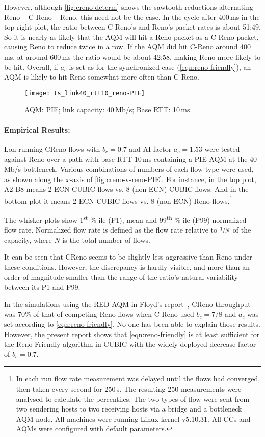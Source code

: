 However, although \autoref{fig:creno-determ} shows the sawtooth reductions alternating Reno -- C-Reno -- Reno, this need not be the case. In the cycle after 400\,ms in the top-right plot, the ratio between C-Reno's and Reno's packet rates is about 51:49. So it is nearly as likely that the AQM will hit a Reno packet as a C-Reno packet, causing Reno to reduce twice in a row. If the AQM did hit C-Reno around 400\,ms, at around 600\,ms the ratio would be about 42:58, making Reno more likely to be hit. Overall, if \(a_c\) is set as for the synchronized case (\autoref{eqn:reno-friendly}), an AQM is likely to hit Reno somewhat more often than C-Reno.

\begin{figure}
	\centering
	\texttt{[image: ts\_link40\_rtt10\_reno-PIE]}
	\caption{AQM: PIE; link capacity: 40\,Mb/s; Base RTT: 10\,ms.}\label{fig:creno-v-reno-PIE}
\end{figure}
\paragraph{Empirical Results:} Lon-running CReno flows with \(b_c = 0.7\) and AI factor \(a_c=1.53\) were tested against Reno over a path with base RTT 10\,ms containing a PIE AQM at the 40\,Mb/s bottleneck. Various combinations of numbers of each flow type were used, as shown along the \(x\)-axis of \autoref{fig:creno-v-reno-PIE}. For instance, in the top plot, A2-B8 means 2 ECN-CUBIC flows vs. 8 (non-ECN) CUBIC flows. And in the bottom plot it means 2 ECN-CUBIC flows vs. 8 (non-ECN) Reno flows.\footnote{In each run flow rate measurement was delayed until the flows had converged, then taken every second for 250\,s. The resulting 250 measurements were analysed to calculate the percentiles. The two types of flow were sent from two sendering hosts to two receiving hosts via a bridge and a bottleneck AQM node. All machines were running Linux kernel v5.10.31. All CCs and AQMs were configured with default parameters.}

The whisker plots show 1\textsuperscript{st} \%-ile (P1), mean and 99\textsuperscript{th} \%-ile (P99) normalized flow rate. Normalized flow rate is defined as the flow rate relative to \(\sfrac{1}{N}\) of the capacity, where \(N\) is the total number of flows.

It can be seen that CReno seems to be slightly less aggressive than Reno under these conditions. However, the discrepancy is hardly visible, and more than an order of magnitude smaller than the range of the ratio's natural variability between its P1 and P99.

In the simulations using the RED AQM in Floyd's report~\cite{Floyd00:Eqn_v_AIMD_cc}, CReno throughput was 70\% of that of competing Reno flows when C-Reno used \(b_c=7/8\) and \(a_c\) was set according to  \autoref{eqn:reno-friendly}. No-one has been able to explain those results. However, the present report shows that \autoref{eqn:reno-friendly} is at least sufficient for the Reno-Friendly algorithm in CUBIC with the widely deployed decrease factor of \(b_c=0.7\).

